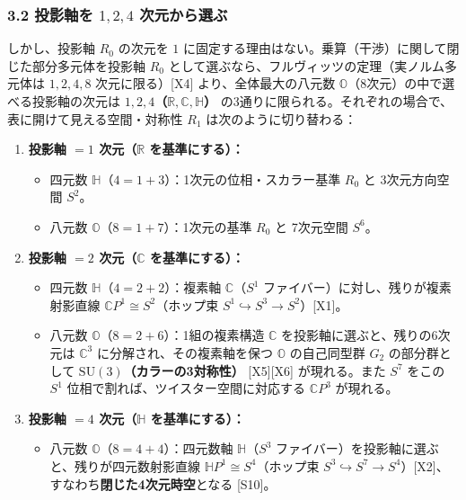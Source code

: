 \documentclass[
  a4paper,
]{ltjsarticle}
\providecommand{\tightlist}{%
  \setlength{\itemsep}{0pt}\setlength{\parskip}{0pt}}
\begin{document}
\subsubsection{\texorpdfstring{3.2 投影軸を \(1, 2, 4\)
次元から選ぶ}{3.2 投影軸を 1, 2, 4 次元から選ぶ}}\label{ux6295ux5f71ux8ef8ux3092-1-2-4-ux6b21ux5143ux304bux3089ux9078ux3076}

しかし、投影軸 \(R_0\) の次元を \(1\)
に固定する理由はない。乗算（干渉）に関して閉じた部分多元体を投影軸
\(R_0\) として選ぶなら、フルヴィッツの定理（実ノルム多元体は
\(1, 2, 4, 8\) 次元に限る）{[}X4{]} より、全体最大の八元数
\(\mathbb{O}\)（8次元）の中で選べる投影軸の次元は
\textbf{\(1, 2, 4\)（\(\mathbb{R}, \mathbb{C}, \mathbb{H}\)）}
の3通りに限られる。それぞれの場合で、表に開けて見える空間・対称性
\(R_1\) は次のように切り替わる：

\begin{enumerate}
\def\labelenumi{\arabic{enumi}.}
\tightlist
\item
  \textbf{投影軸 \(= 1\) 次元（\(\mathbb{R}\) を基準にする）：}

  \begin{itemize}
  \tightlist
  \item
    四元数 \(\mathbb{H}\)（\(4 = 1 + 3\)）：1次元の位相・スカラー基準
    \(R_0\) と 3次元方向空間 \(S^2\)。
  \item
    八元数 \(\mathbb{O}\)（\(8 = 1 + 7\)）：1次元の基準 \(R_0\) と
    7次元空間 \(S^6\)。
  \end{itemize}
\item
  \textbf{投影軸 \(= 2\) 次元（\(\mathbb{C}\) を基準にする）：}

  \begin{itemize}
  \tightlist
  \item
    四元数 \(\mathbb{H}\)（\(4 = 2 + 2\)）：複素軸
    \(\mathbb{C}\)（\(S^1\) ファイバー）に対し、残りが複素射影直線
    \(\mathbb{C}P^1 \cong S^2\)（ホップ束
    \(S^1 \hookrightarrow S^3 \to S^2\)）{[}X1{]}。
  \item
    八元数 \(\mathbb{O}\)（\(8 = 2 + 6\)）：1組の複素構造 \(\mathbb{C}\)
    を投影軸に選ぶと、残りの6次元は \(\mathbb{C}^3\)
    に分解され、その複素軸を保つ \(\mathbb{O}\) の自己同型群 \(G_2\)
    の部分群として \textbf{\(\mathrm{SU}(3)\)（カラーの3対称性）}
    {[}X5{]}{[}X6{]} が現れる。また \(S^7\) をこの \(S^1\)
    位相で割れば、ツイスター空間に対応する \(\mathbb{C}P^3\) が現れる。
  \end{itemize}
\item
  \textbf{投影軸 \(= 4\) 次元（\(\mathbb{H}\) を基準にする）：}

  \begin{itemize}
  \tightlist
  \item
    八元数 \(\mathbb{O}\)（\(8 = 4 + 4\)）：四元数軸
    \(\mathbb{H}\)（\(S^3\)
    ファイバー）を投影軸に選ぶと、残りが四元数射影直線
    \(\mathbb{H}P^1 \cong S^4\)（ホップ束
    \(S^3 \hookrightarrow S^7 \to S^4\)）{[}X2{]}、すなわち\textbf{閉じた4次元時空}となる
    {[}S10{]}。
  \end{itemize}
\end{enumerate}
\end{document}

